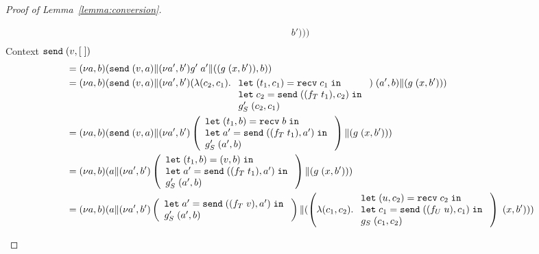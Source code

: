 \begin{proof}[Proof of Lemma~\ref{lemma:conversion}]
\begin{enumerate}
\begin{itemize}
\begin{align*}
{{{{        b') })}}})  \\
      \end{align*}
      Context $\mathtt{send}\; (v,[\;])$
      \begin{align*}
        &= \PScope ({\PPar {\ESend va} {\PScope[a',b'] \PPar {g' \; a'} {(({ g \; (x,
        b') }), b)}}})  \\
        &= \PScope ({\PPar {\ESend va} {\PScope[a',b'] \PPar {(
          \ELam {(c_2, c_1)}
          \begin{array}[t]{l}
        \ELetP {t_1} {c_1} {\ERecv{c_1}} \\
        \ELet {c_2} {\ESend {(f_T \; t_1)} {c_2}} \\
          g'_S \; (c_2, c_1)
          \end{array}
          ) \; (a', b)} {({ g \; (x,
        b') })}}})  \\
        &= \PScope ({\PPar {\ESend va} {\PScope[a',b'] \PPar {\left(
          \begin{array}{l}
        \ELetP {t_1} {b} {\ERecv{b}} \\
        \ELet {a'} {\ESend {(f_T \; t_1)} {a'}} \\
          g'_S \; (a', b)
          \end{array}
        \right)} {({ g \; (x,
        b') })}}})  \\
        &= \PScope ({\PPar {a} {\PScope[a',b'] \PPar {\left(
          \begin{array}{l}
        \ELetP {t_1} {b} {(v,{b})} \\
        \ELet {a'} {\ESend {(f_T \; t_1)} {a'}} \\
          g'_S \; (a', b)
          \end{array}
        \right)} {({ g \; (x,
        b') })}}})  \\
        &= \PScope ({\PPar {a} {\PScope[a',b'] \PPar {\left(
          \begin{array}{l}
        \ELet {a'} {\ESend {(f_T \; v)} {a'}} \\
          g'_S \; (a', b)
          \end{array}
        \right)} {({ \left(
        \ELam {(c_1, c_2)}
        \begin{array}{l}
          \ELetP {u} {c_2} {\ERecv{c_2}} \\
        \ELet {c_1} {\ESend {(f_U \; u)} {c_1}}  \\
        g_S \; (c_1, c_2)
        \end{array}
        \right) \; (x,
        b') })}}})  \\

\end{align*}
\end{itemize}
\end{enumerate}
\end{proof}
